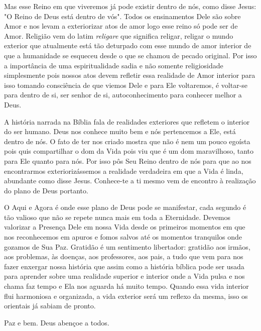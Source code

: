 \emdash{}Mas esse Reino em que viveremos já pode existir dentro de nós, como disse Jesus: "O Reino de Deus está dentro de vós". Todos os ensinamentos Dele são sobre Amor e nos levam a exteriorizar atos de amor logo esse reino só pode ser de Amor. Religião vem do latim \textit{religare} que significa religar, religar o mundo exterior que atualmente está tão deturpado com esse mundo de amor interior de que a humanidade se esqueceu desde o que se chamou de pecado original. Por isso a importância de uma espiritualidade sadia e não somente religiosidade simplesmente pois nossos atos devem refletir essa realidade de Amor interior para isso tomando consciência de que viemos Dele e para Ele voltaremos, é voltar-se para dentro de si, ser senhor de si, autoconhecimento para conhecer melhor a Deus. 


\emdash{}A história narrada na Bíblia fala de realidades exteriores que refletem o interior do ser humano. Deus nos conhece muito bem e nós pertencemos a Ele, está dentro de nós. O fato de ter nos criado mostra que não é nem um pouco egoísta pois quis compartilhar o dom da Vida pois viu que é um dom maravilhoso, tanto para Ele quanto para nós. Por isso pôs Seu Reino dentro de nós para que ao nos encontrarmos exteriorizássemos a realidade verdadeira em que a Vida é linda, abundante como disse Jesus. Conhece-te a ti mesmo vem de encontro à realização do plano de Deus portanto.

\emdash{}O Aqui e Agora é onde esse plano de Deus pode se manifestar, cada segundo é tão valioso que não se repete nunca mais em toda a Eternidade. Devemos valorizar a Presença Dele em nossa Vida desde os primeiros momentos em que nos reconhecemos em apuros e fomos salvos até os momentos tranquilos onde gozamos de Sua Paz. Gratidão é um sentimento libertador: gratidão aos irmãos, aos problemas, às doenças, aos professores, aos pais, a tudo que vem para nos fazer enxergar nossa história que assim como a história bíblica pode ser usada para aprender sobre uma realidade superior e interior onde a Vida pulsa e nos chama faz tempo e Ela nos aguarda há muito tempo. Quando essa vida interior flui harmoniosa e organizada, a vida exterior será um reflexo da mesma, isso os orientais já sabiam de pronto.

\emdash{}Paz e bem. Deus abençoe a todos.